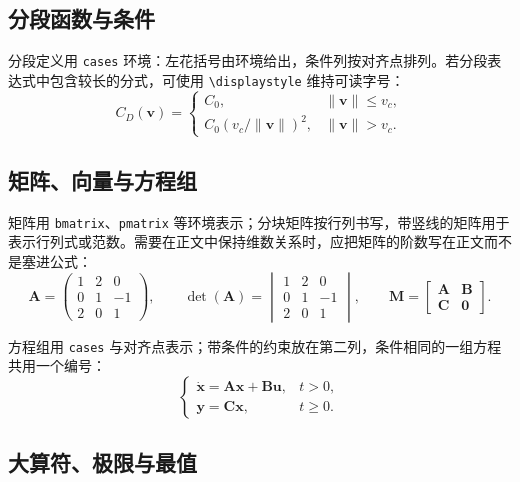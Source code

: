 \subsection{分段函数与条件}

分段定义用 \texttt{cases} 环境：左花括号由环境给出，条件列按对齐点排列。若分段表达式中包含较长的分式，可使用 \texttt{\textbackslash displaystyle} 维持可读字号：
\begin{equation}
  C_D(\bm{v})=
  \begin{cases}
    C_0, & \|\bm{v}\|\leq v_c,\\
    C_0\left(v_c/\|\bm{v}\|\right)^2, & \|\bm{v}\|>v_c.
  \end{cases}
  \label{eq:piecewise-drag}
\end{equation}

\subsection{矩阵、向量与方程组}

矩阵用 \texttt{bmatrix}、\texttt{pmatrix} 等环境表示；分块矩阵按行列书写，带竖线的矩阵用于表示行列式或范数。需要在正文中保持维数关系时，应把矩阵的阶数写在正文而不是塞进公式：
\begin{equation}
  \bm{A}=
  \begin{pmatrix}1&2&0\\0&1&-1\\2&0&1\end{pmatrix},\qquad
  \det(\bm{A})=
  \begin{vmatrix}1&2&0\\0&1&-1\\2&0&1\end{vmatrix},\qquad
  \bm{M}=
  \begin{bmatrix}\bm{A}&\bm{B}\\\bm{C}&\bm{0}\end{bmatrix}.
  \label{eq:matrix-family}
\end{equation}

方程组用 \texttt{cases} 与对齐点表示；带条件的约束放在第二列，条件相同的一组方程共用一个编号：
\begin{equation}
  \begin{cases}
    \dot{\bm{x}}=\bm{A}\bm{x}+\bm{B}\bm{u}, & t>0,\\
    \bm{y}=\bm{C}\bm{x}, & t\geq0.
  \end{cases}
  \label{eq:system}
\end{equation}

\subsection{大算符、极限与最值}

